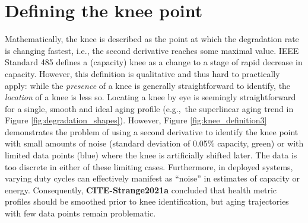 \documentclass[journal=jpcl, manuscript=article, layout=onecolumn]{achemso}
\newcommand{\cmark}{\textcolor{blue}{\textrm{\ding{52}}}}%
\newcommand{\pbox}[1]{{
\fbox{
\parbox{0.8\textwidth}{  \fbox{$\triangleright$\textcolor{blue}{\textbf{From Peter}:}} 
#1
}}}}
\begin{document}
\section{Defining the knee point}


Mathematically, the knee is described as the point at which the degradation rate is changing fastest, i.e., the second derivative reaches some maximal value. IEEE Standard 485  \cite{noauthor_ieee_2011} defines a (capacity) knee as a change to a stage of rapid decrease in capacity. However, this definition is qualitative and thus hard to practically apply: while the \textit{presence} of a knee is generally straightforward to identify, the \textit{location} of a knee is less so. 
Locating a knee by eye is seemingly straightforward for a single, smooth and ideal aging profile (e.g.,~the superlinear aging trend in Figure \ref{fig:degradation_shapes}). However, Figure \ref{fig:knee_definition3} demonstrates the problem of using a second derivative to identify the knee point with small amounts of noise (standard deviation of 0.05\% capacity, green) or with limited data points (blue) where the knee is artificially shifted later. The data is too discrete in either of these limiting cases. Furthermore, in deployed systems, varying duty cycles can effectively manifest as ``noise'' in estimates of capacity or energy.
Consequently, \textbf{CITE-Strange2021a} concluded that health metric profiles should be smoothed prior to knee identification, but aging trajectories with few data points remain problematic.
\end{document}
